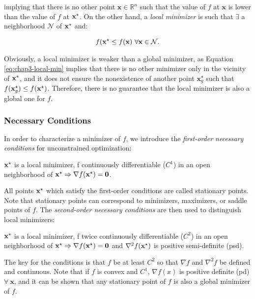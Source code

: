 implying that there is no other point $\mathbf{x}\in\mathbb R^n$ such
that the value of $f$ at $\mathbf{x}$ is lower than the value of $f$
at $\mathbf{x}^{\star}$. On the other hand, a \emph{local minimizer} is such
that $\exists$ a neighborhood $\mathcal{N}$ of $\mathbf{x}^{\star}$ and:

\begin{equation}
\label{eq:chap3-local-min}
  f(\mathbf{x}^{\star} \le f(\mathbf{x})~\forall \mathbf{x} \in \mathcal{N}.
\end{equation}

Obviously, a local minimizer is weaker than a global minimizer, as
Equation \ref{eq:chap3-local-min} implies that there is no other
minimizer only in the vicinity of $\mathbf{x}^{\star}$, and it does not ensure
the nonexistence of another point $\mathbf{x}^\star_g$ such that
$f(\mathbf{x}^\star_g) \le f(\mathbf{x}^{\star})$. Therefore, there is no
guarantee that the local minimizer is also a global one for $f$.

\subsubsection{Necessary Conditions}

In order to characterize a minimizer of $f$, we introduce the
\emph{first-order necessary conditions} for unconstrained
optimization:

\begin{theorem}
\label{thm:chap3-first-order-cond}
$\mathbf{x}^{\star}$ is a local minimizer, f continuously differentiable
($C^1$) in an open neighborhood of $\mathbf{x}^{\star} \Rightarrow
\nabla f(\mathbf{x}^{\star}) = \mathbf{0}$.
\end{theorem}

All points $\mathbf{x}^{\star}$ which satisfy the first-order conditions are
called stationary points. Note that stationary points can correspond
to minimizers, maximizers, or saddle points of $f$. The
\emph{second-order necessary conditions} are then used to distinguish
local minimizers:

\begin{theorem}
\label{thm:chap3-second-order-cond}
$\mathbf{x}^{\star}$ is a local minimizer, f twice continuously differentiable
($C^2$) in an open neighborhood of $\mathbf{x}^{\star} \Rightarrow \nabla
f(\mathbf{x}^{\star}) = \mathbf{0}$ and $\nabla^2 f(\mathbf{x}^{\star})$ is positive
semi-definite (psd).
\end{theorem}

The key for the conditions is that $f$ be at least $C^2$ so that
$\nabla f$ and $\nabla^2 f$ be defined and continuous. Note that if
$f$ is convex and $C^1$, $\nabla f(x)$ is positive definite (pd)
$\forall~\mathbf{x}$, and it can be shown that any stationary point of
$f$ is also a global minimizer of $f$.

